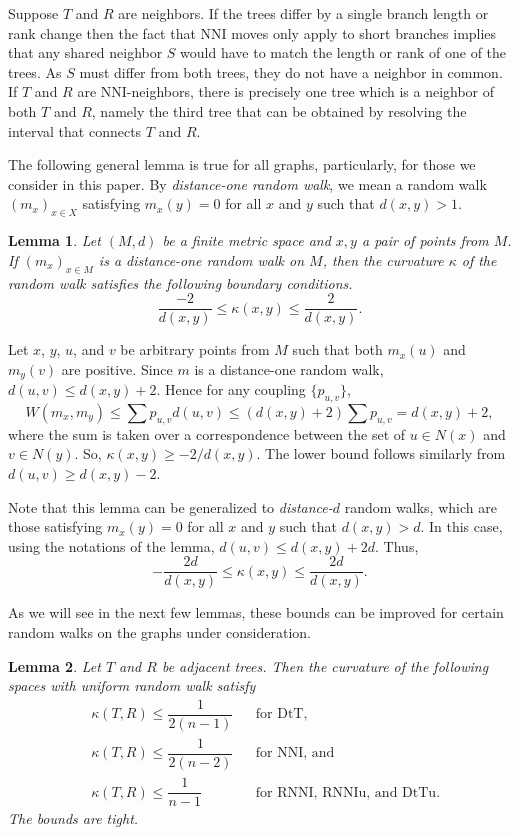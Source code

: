 \documentclass[11pt]{amsart}
\newtheorem{lemma}{Lemma}
\theoremstyle{definition}
\newcommand{\nni}{\mathrm{NNI}}
\newcommand{\rnni}{\mathrm{RNNI}}
\newcommand{\rnniu}{\mathrm{RNNIu}}
\newcommand{\dtt}{\mathrm{DtT}}
\newcommand{\dttu}{\mathrm{DtTu}}
\begin{document}
{\proof
Suppose $T$ and $R$ are neighbors.
If the trees differ by a single branch length or rank change then the fact that $\nni$ moves only apply to short branches implies that any shared neighbor $S$ would have to match the length or rank of one of the trees.
As $S$ must differ from both trees, they do not have a neighbor in common.
If $T$ and $R$ are $\nni$-neighbors, there is precisely one tree which is a neighbor of both $T$ and $R$, namely the third tree that can be obtained by resolving the interval that connects $T$ and $R$.
\endproof

The following general lemma is true for all graphs, particularly, for those we consider in this paper.
By \emph{distance-one random walk}, we mean a random walk $(m_x)_{x \in X}$ satisfying $m_x(y) = 0$ for all $x$ and $y$ such that $d(x,y) > 1$.

\begin{lemma}
\label{curvBoundGeneral}
Let $(M,d)$ be a finite metric space and $x,y$ a pair of points from $M$.
If $(m_x)_{x \in M}$ is a distance-one random walk on $M$, then the curvature $\kappa$ of the random walk satisfies the following boundary conditions.
\[
\dfrac{-2}{d(x,y)} \leq \kappa(x,y) \leq \dfrac{2}{d(x,y)}.
\]
\end{lemma}

\proof
Let $x$, $y$, $u$, and $v$ be arbitrary points from $M$ such that both $m_x(u)$ and $m_y(v)$ are positive.
Since $m$ is a distance-one random walk, $d(u,v) \leq d(x,y) + 2$.
Hence for any coupling $\{p_{u,v}\}$,
\[
W(m_x,m_y) \leq \sum p_{u,v} d(u,v) \leq (d(x,y)+2)\sum p_{u,v} = d(x,y) + 2,
\]
where the sum is taken over a correspondence between the set of $u \in N(x)$ and $v \in N(y)$.
So, $\kappa(x,y) \geq - 2/d(x,y)$.
The lower bound follows similarly from $d(u,v) \geq d(x,y) - 2$.
\endproof

Note that this lemma can be generalized to \emph{distance-$d$} random walks, which are those satisfying $m_x(y) = 0$ for all $x$ and $y$ such that $d(x,y) > d$.
In this case, using the notations of the lemma, $d(u,v) \leq d(x,y) + 2d$.
Thus,
\[
-\dfrac{2d}{d(x,y)} \leq \kappa(x,y) \leq \dfrac{2d}{d(x,y)}.
\]

As we will see in the next few lemmas, these bounds can be improved for certain random walks on the graphs under consideration.

\begin{lemma}
\label{uniformUpper}
Let $T$ and $R$ be adjacent trees.
Then the curvature of the following spaces with uniform random walk satisfy
\begin{align*}
& \kappa(T,R) \leq \dfrac{1}{2(n-1)}	&& \mbox{for $\dtt$,}\\
& \kappa(T,R) \leq \dfrac{1}{2(n-2)}	&& \mbox{for $\nni$, and}\\
& \kappa(T,R) \leq \dfrac{1}{n-1}	&& \mbox{for $\rnni$, $\rnniu$, and $\dttu$.}
\end{align*}
The bounds are tight.
\end{lemma}

}
\end{document}
